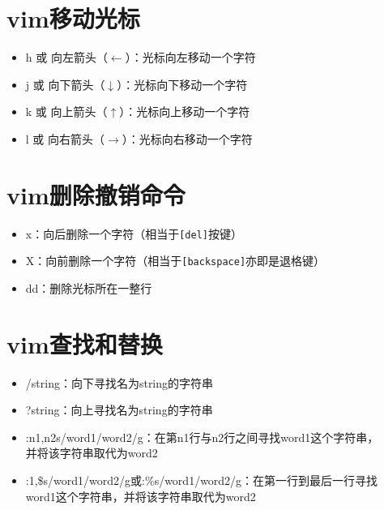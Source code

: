 \documentclass{notebook}
\begin{document}
\section{vim移动光标}
\begin{itemize}
    \item h 或 向左箭头（$\leftarrow$）：光标向左移动一个字符
    \item j 或 向下箭头（$\downarrow$）：光标向下移动一个字符
    \item k 或 向上箭头（$\uparrow$）：光标向上移动一个字符
    \item l 或 向右箭头（$\rightarrow$）：光标向右移动一个字符
\end{itemize}
\section{vim删除撤销命令}
\begin{itemize}
    \item x：向后删除一个字符（相当于\verb|[del]|按键）
    \item X：向前删除一个字符（相当于\verb|[backspace]|亦即是退格键）
    \item dd：删除光标所在一整行
\end{itemize}
\section{vim查找和替换}
\begin{itemize}
    \item /string：向下寻找名为string的字符串
    \item ?string：向上寻找名为string的字符串
    \item :n1,n2s/word1/word2/g：在第n1行与n2行之间寻找word1这个字符串，\\并将该字符串取代为word2
    \item :1,\$s/word1/word2/g或:\%s/word1/word2/g：在第一行到最后一行寻找\\word1这个字符串，并将该字符串取代为word2
\end{itemize}
\end{document}
